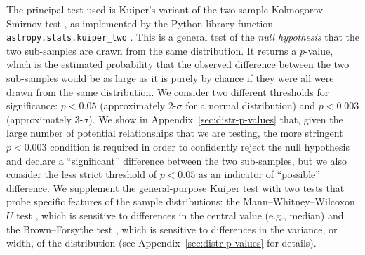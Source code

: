 \documentclass[useAMS, usenatbib, a4paper]{mnras}
\begin{document}
The principal test used is Kuiper's variant of the two-sample
Kolmogorov--Smirnov test \citep[e.g.,][]{Stephens:1970a, Paltani:2004a}, as implemented by the Python library function \texttt{astropy.stats.kuiper\_two} \citep{Astropy-Collaboration:2018a}.   This is a
general test of the \textit{null hypothesis} that the two sub-samples
are drawn from the same distribution.  It returns a \(p\)-value, which
is the estimated probability that the observed difference between the
two sub-samples would be as large as it is purely by chance if they
were all were drawn from the same distribution.  We consider two
different thresholds for significance: \(p < 0.05\) (approximately
2-\(\sigma\) for a normal distribution) and \(p < 0.003\) (approximately
3-\(\sigma\)).  We show in Appendix~\ref{sec:distr-p-values} that, given
the large number of potential relationships that we are testing, the
more stringent \(p < 0.003\) condition is required in order to
confidently reject the null hypothesis and declare a ``significant''
difference between the two sub-samples, but we also consider the less
strict threshold of \(p < 0.05\) as an indicator of ``possible''
difference.  We supplement the general-purpose Kuiper test
with two tests that probe specific features of the sample
distributions: the Mann--Whitney--Wilcoxon \(U\) test
\citep{Mann:1947a}, which is sensitive to differences in the central
value (e.g., median) and the Brown--Forsythe test \citep{Brown:1974a},
which is sensitive to differences in the variance, or width, of the
distribution (see Appendix~\ref{sec:distr-p-values} for details).
  
\end{document}

